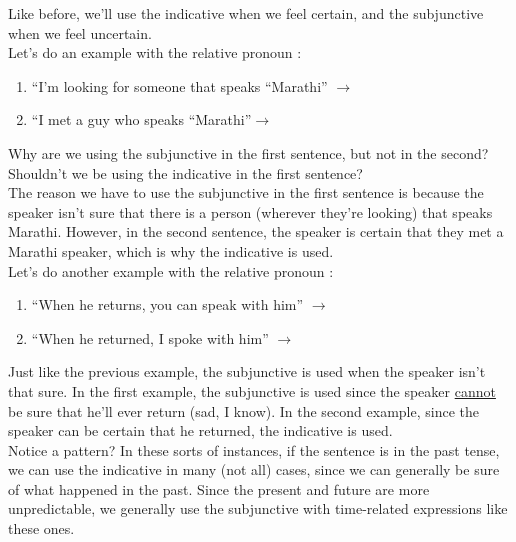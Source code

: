 Like before, we'll use the indicative when we feel certain, and the subjunctive when we feel uncertain. \\

Let's do an example with the relative pronoun :
\begin{enumerate}[noitemsep]
	\item ``I'm looking for someone that speaks ``Marathi'' $\rightarrow$ 
	\item ``I met a guy who speaks ``Marathi''$ \rightarrow$ 
\end{enumerate}

Why are we using the subjunctive in the first sentence, but not in the second? Shouldn't we be using the indicative in the first sentence? \\

The reason we have to use the subjunctive in the first sentence is because the speaker isn't sure that there is a person (wherever they're looking) that speaks Marathi. However, in the second sentence, the speaker is certain that they met a Marathi speaker, which is why the indicative is used. \\

Let's do another example with the relative pronoun :
\begin{enumerate}[noitemsep]
	\item ``When he returns, you can speak with him'' $\rightarrow$ 
	\item ``When he returned, I spoke with him'' $\rightarrow$ 
\end{enumerate}

Just like the previous example, the subjunctive is used when the speaker isn't that sure. In the first example, the subjunctive is used since the speaker \underline{cannot} be sure that he'll ever return (sad, I know). In the second example, since the speaker can be certain that he returned, the indicative is used. \\

Notice a pattern? In these sorts of instances, if the sentence is in the past tense, we can use the indicative in many (not all) cases, since we can generally be sure of what happened in the past. Since the present and future are more unpredictable, we generally use the subjunctive with time-related expressions like these ones. \\

